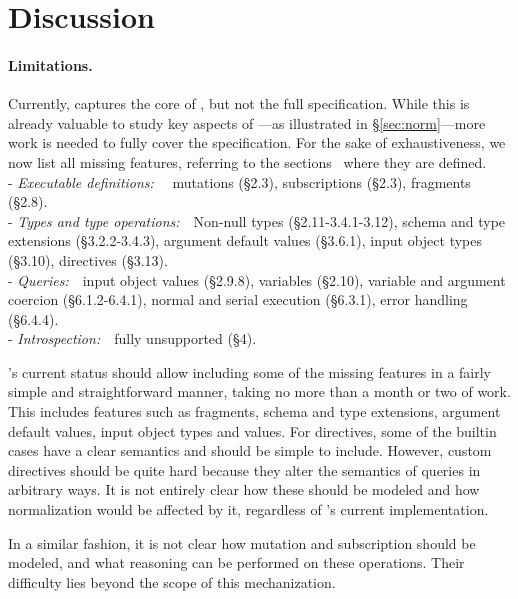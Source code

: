 \section{Discussion}\label{sec:discussion}

\paragraph{Limitations.}

Currently, \gcoql captures the core of \gql, but not the full specification. While this is already valuable to study key aspects of \gql---as illustrated in \S\ref{sec:norm}---more work is needed to fully cover the specification. 
For the sake of exhaustiveness, we now list all missing features, referring to the \spec sections~\cite{gqlspec} where they are defined.\\
- \emph{Executable definitions:}\ \ %
mutations (\S2.3), subscriptions (\S2.3), fragments (\S2.8).\\
- \emph{Types and type operations:}\ \ Non-null types (\S2.11-3.4.1-3.12), schema and type extensions (\S3.2.2-3.4.3), argument default values (\S3.6.1), input object types (\S3.10), directives (\S3.13).\\
- \emph{Queries:}\ \ input object values (\S2.9.8), variables (\S2.10), variable and argument coercion (\S6.1.2-6.4.1), normal and serial execution (\S6.3.1), error handling (\S6.4.4).\\
- \emph{Introspection:}\ \ fully unsupported (\S4). 

\gcoql's current status should allow including some of the missing features in a fairly simple and straightforward manner, taking no more than a month or two of work.
This includes features such as fragments, schema and type extensions, argument default values, input object types and values. 
For directives, some of the builtin cases have a clear semantics and should be simple to include. 
However, custom directives should be quite hard because they alter the semantics of queries in arbitrary ways.
It is not entirely clear how these should be modeled and how normalization
would be affected by it, regardless of \gcoql's current implementation. 

In a similar fashion, it is not clear how mutation and subscription should be modeled, and
what reasoning can be performed on these operations. 
Their difficulty lies beyond the scope of this mechanization.  


